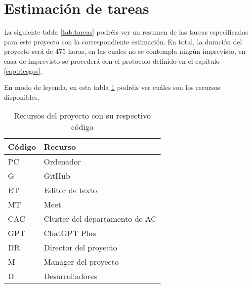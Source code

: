 \section{Estimación de tareas}
\label{sec:estimacion_tareas}


La siguiente tabla \ref{tab:tareas} podréis ver un resumen de las tareas especificadas para este proyecto con la correspondiente estimación. En total,
la duración del proyecto será de 475 horas, en las cuales no se contempla ningún imprevisto, en casa de imprevisto se procederá con el protocolo definido
en el capítulo \ref{cap:riesgos}.

En modo de leyenda, en esta tabla \ref{tab:recursos} podréis ver cuáles son los recursos disponibles.

\begin{table}[H]
    \centering
    \begin{tabular}{|l|l|}
    \hline
    \rowcolor[HTML]{8EA9D8} 
    Código & Recurso                        \\ \hline
    PC     & Ordenador                      \\ \hline
    G      & GitHub                         \\ \hline
    ET     & Editor de texto                \\ \hline
    MT     & Meet                           \\ \hline
    CAC    & Cluster del departamento de AC \\ \hline
    GPT    & ChatGPT Plus                   \\ \hline
    DR     & Director del proyecto          \\ \hline
    M      & Manager del proyecto           \\ \hline
    D      & Desarrolladores                \\ \hline
    \end{tabular}
    \caption{Recursos del proyecto con su respectivo código}
    \label{tab:recursos}
\end{table}

